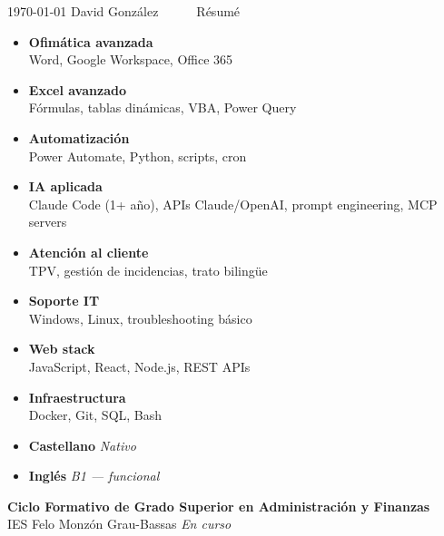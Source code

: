 \documentclass[10pt, a4paper]{awesome-cv}
\begin{document}
\makecvheader[C]
\makecvfooter
  { \today }
  { David González~~~\textperiodcentered~~~Résumé }
  { \thepage }

\noindent\begin{minipage}[t]{0.32\textwidth}
\vspace{0pt}



\begin{itemize}[leftmargin=*, label={}, itemsep=2pt]
\item \textbf{Ofimática avanzada}\\{\footnotesize Word, Google Workspace, Office 365}
\item \textbf{Excel avanzado}\\{\footnotesize Fórmulas, tablas dinámicas, VBA, Power Query}
\item \textbf{Automatización}\\{\footnotesize Power Automate, Python, scripts, cron}
\item \textbf{IA aplicada}\\{\footnotesize Claude Code (1+ año), APIs Claude/OpenAI, prompt engineering, MCP servers}
\item \textbf{Atención al cliente}\\{\footnotesize TPV, gestión de incidencias, trato bilingüe}
\item \textbf{Soporte IT}\\{\footnotesize Windows, Linux, troubleshooting básico}
\item \textbf{Web stack}\\{\footnotesize JavaScript, React, Node.js, REST APIs}
\item \textbf{Infraestructura}\\{\footnotesize Docker, Git, SQL, Bash}
\end{itemize}



\begin{itemize}[leftmargin=*, label={}, itemsep=2pt]
\item \textbf{Castellano} \hfill \textit{Nativo}
\item \textbf{Inglés} \hfill \textit{B1 — funcional}
\end{itemize}



\par\vspace{4pt}
\textbf{Ciclo Formativo de Grado Superior en Administración y Finanzas}\\
{\small IES Felo Monzón Grau-Bassas \hfill\textit{En curso} }


\end{minipage}
\end{document}
